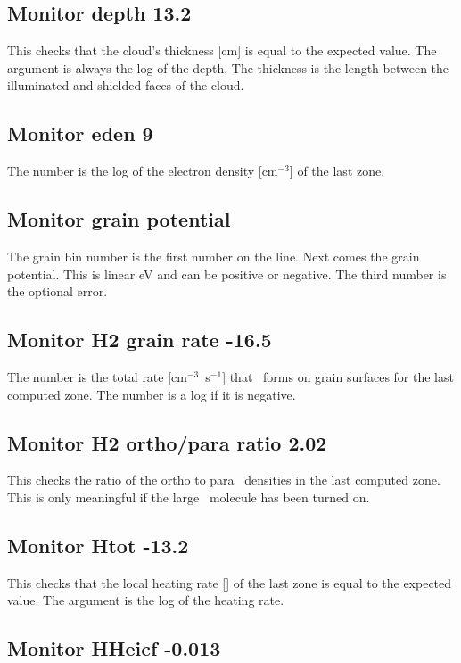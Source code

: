 \subsection{Monitor depth 13.2}

This checks that the cloud's thickness [cm] is equal to the expected
value.
The argument is always the log of the depth.
The thickness is the
length between the illuminated and shielded faces of the cloud.

\subsection{Monitor eden 9}

The number is the log of the electron density [cm$^{-3}$] of the last zone.

\subsection{Monitor grain potential}

The grain bin number is the first number on the line.  Next comes the
grain potential.
This is linear eV and can be positive or negative.
The third number is the optional error.

\subsection{Monitor H2 grain rate -16.5}

The number is the total rate [cm$^{-3}$~s$^{-1}$] that \htwo\ forms on grain surfaces
for the last computed zone.
The number is a log if it is negative.

\subsection{Monitor H2 ortho/para ratio 2.02}

This checks the ratio of the ortho to para \htwo\ densities in the last
computed zone.
This is only meaningful if the large \htwo\ molecule has been
turned on.

\subsection{Monitor Htot -13.2}

This checks that the local heating rate [\ergpccmps ]
of the last zone is equal to the expected value.
The argument is the log of the heating rate.

\subsection{Monitor HHeicf -0.013}

